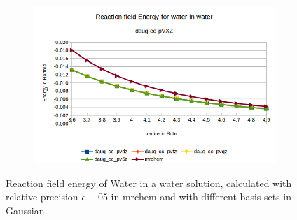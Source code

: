\documentclass[../master_thesis.tex]{subfiles}
\begin{document}
\begin{figure}[h!]
\begin{subfigure}[b]{0.75\linewidth}
  \end{subfigure}
  \begin{subfigure}[b]{0.75\linewidth}
    \includegraphics[width=\linewidth]{img/Erdaugwat.png}
  \end{subfigure}
  \caption{Reaction field energy of Water in a water solution, calculated with relative precision $e-05$ in mrchem
  and with different basis sets in Gaussian}
  \label{fig:watEnergyplots}
\end{figure}
\end{document}
